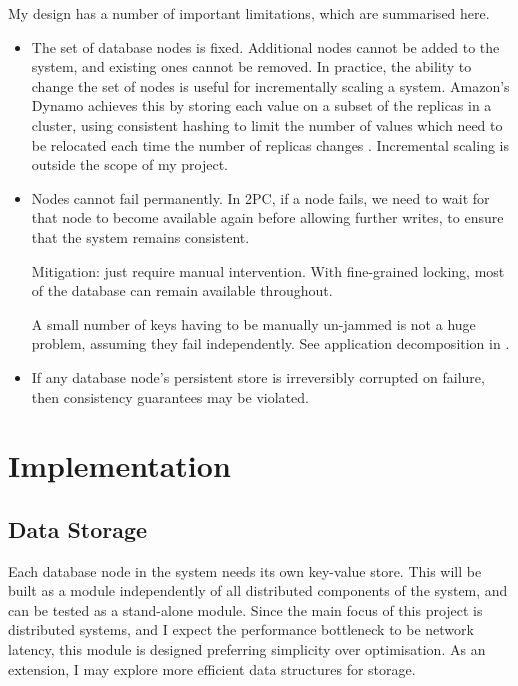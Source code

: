 \documentclass[12pt,a4paper,twoside,openright]{report}
\begin{document}
My design has a number of important limitations, which are summarised here.

\begin{itemize}
\item
The set of database nodes is fixed. Additional nodes cannot be added to the system, and existing ones cannot be removed. In practice, the ability to change the set of nodes is useful for incrementally scaling a system. Amazon's Dynamo achieves this by storing each value on a subset of the replicas in a cluster, using consistent hashing to limit the number of values which need to be relocated each time the number of replicas changes \cite{decandia2007dynamo}. Incremental scaling is outside the scope of my project.

\item
Nodes cannot fail permanently. In 2PC, if a node fails, we need to wait for that node to become available again before allowing further writes, to ensure that the system remains consistent.

Mitigation: just require manual intervention. With fine-grained locking, most of the database can remain available throughout.

A small number of keys having to be manually un-jammed is not a huge problem, assuming they fail independently. See application decomposition in \cite{fox1999harvest}.


\item
If any database node's persistent store is irreversibly corrupted on failure, then consistency guarantees may be violated.

\end{itemize}

\chapter{Implementation}


\section{Data Storage}

Each database node in the system needs its own key-value store. This will be built as a module independently of all distributed components of the system, and can be tested as a stand-alone module. Since the main focus of this project is distributed systems, and I expect the performance bottleneck to be network latency, this module is designed preferring simplicity over optimisation. As an extension, I may explore more efficient data structures for storage.
\end{document}

